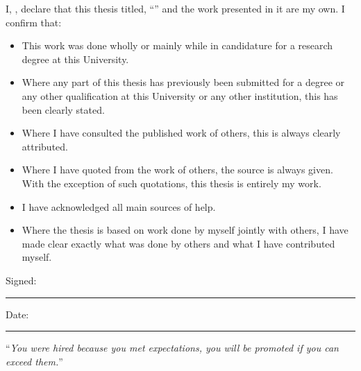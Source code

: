 \documentclass[
11pt, %
oneside, %
english, %
singlespacing, %
headsepline, %
]{MastersDoctoralThesis} %
\theoremstyle{assumption}
\theoremstyle{definition}
\theoremstyle{proposition}
\begin{document}

\begin{declaration}
\addchaptertocentry{\authorshipname} %
\noindent I, \authorname, declare that this thesis titled, \enquote{\ttitle} and the work presented in it are my own. I confirm that:

\begin{itemize} 
\item This work was done wholly or mainly while in candidature for a research degree at this University.
\item Where any part of this thesis has previously been submitted for a degree or any other qualification at this University or any other institution, this has been clearly stated.
\item Where I have consulted the published work of others, this is always clearly attributed.
\item Where I have quoted from the work of others, the source is always given. With the exception of such quotations, this thesis is entirely my work.
\item I have acknowledged all main sources of help.
\item Where the thesis is based on work done by myself jointly with others, I have made clear exactly what was done by others and what I have contributed myself.\\
\end{itemize}
 
\noindent Signed:\\
\rule[0.5em]{25em}{0.5pt} %
 
\noindent Date:\\
\rule[0.5em]{25em}{0.5pt} %
\end{declaration}

\cleardoublepage


\vspace*{0.2\textheight}

\noindent\enquote{\itshape You were hired because you met expectations, you will be promoted if you can exceed them.}\bigbreak
\end{document}
